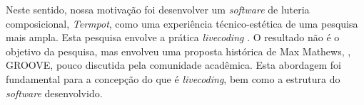Neste sentido, nossa motivação foi desenvolver um \emph{software} de luteria composicional, \emph{Termpot}, como uma experiência técnico-estética de uma pesquisa mais ampla. Esta pesquisa envolve a prática \emph{livecoding} \cite{collins_origins_2014}. O resultado não é o objetivo da pesquisa, mas envolveu uma proposta histórica de Max Mathews, \cite{mathews_groove_1970}, GROOVE, pouco discutida pela comunidade acadêmica. Esta abordagem foi fundamental para a concepção do que é \emph{livecoding}, bem como a estrutura do \emph{software} desenvolvido.


